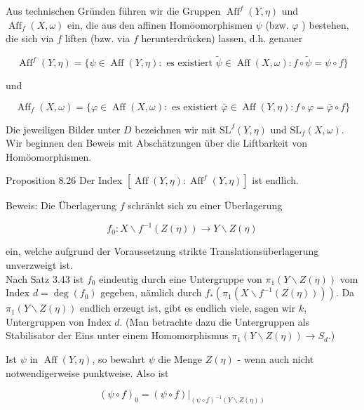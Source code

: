 \documentclass[10pt, letterpaper]{article}
\begin{document}
Aus technischen Gründen führen wir die Gruppen $\operatorname{Aff}^{f}(Y, \eta)$ und $\operatorname{Aff}_{f}(X, \omega)$ ein, die aus den affinen Homöomorphismen $\psi$ (bzw. $\varphi$ ) bestehen, die sich via $f$ liften (bzw. via $f$ herunterdrücken) lassen, d.h. genauer

$$
\operatorname{Aff}^{f}(Y, \eta)=\{\psi \in \operatorname{Aff}(Y, \eta): \text { es existiert } \widetilde{\psi} \in \operatorname{Aff}(X, \omega): f \circ \widetilde{\psi}=\psi \circ f\}
$$

und

$$
\operatorname{Aff}_{f}(X, \omega)=\{\varphi \in \operatorname{Aff}(X, \omega): \text { es existiert } \bar{\varphi} \in \operatorname{Aff}(Y, \eta): f \circ \varphi=\bar{\varphi} \circ f\}
$$

Die jeweiligen Bilder unter $D$ bezeichnen wir mit $\mathrm{SL}^{f}(Y, \eta)$ und $\mathrm{SL}_{f}(X, \omega)$. Wir beginnen den Beweis mit Abschätzungen über die Liftbarkeit von Homöomorphismen.

Proposition 8.26 Der Index $\left[\operatorname{Aff}(Y, \eta): \operatorname{Aff}^{f}(Y, \eta)\right]$ ist endlich.

Beweis: Die Überlagerung $f$ schränkt sich zu einer Überlagerung

$$
f_{0}: X \backslash f^{-1}(Z(\eta)) \longrightarrow Y \backslash Z(\eta)
$$

ein, welche aufgrund der Voraussetzung strikte Translationsüberlagerung unverzweigt ist.\\
Nach Satz 3.43 ist $f_{0}$ eindeutig durch eine Untergruppe von $\pi_{1}(Y \backslash Z(\eta))$ vom Index $d=\operatorname{deg}\left(f_{0}\right)$ gegeben, nämlich durch $f_{*}\left(\pi_{1}\left(X \backslash f^{-1}(Z(\eta))\right)\right)$. Da $\pi_{1}(Y \backslash Z(\eta))$ endlich erzeugt ist, gibt es endlich viele, sagen wir $k$, Untergruppen von Index $d$. (Man betrachte dazu die Untergruppen als Stabilisator der Eins unter einem Homomorphismus $\pi_{1}(Y \backslash Z(\eta)) \rightarrow S_{d}$.)

Ist $\psi$ in $\operatorname{Aff}(Y, \eta)$, so bewahrt $\psi$ die Menge $Z(\eta)$ - wenn auch nicht notwendigerweise punktweise. Also ist

$$
(\psi \circ f)_{0}=\left.(\psi \circ f)\right|_{(\psi \circ f)^{-1}(Y \backslash Z(\eta))}
$$
\end{document}
